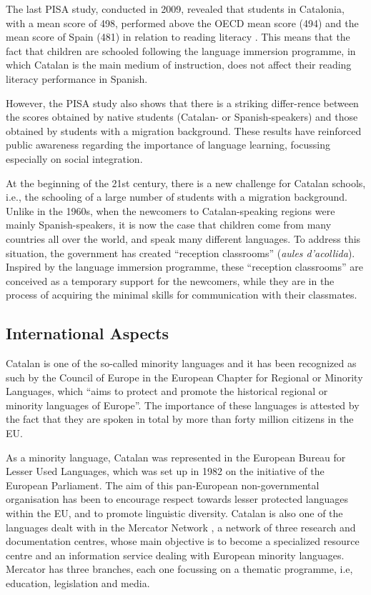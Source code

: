 \begin{multicols}{2}
The last PISA study, conducted in 2009, revealed that students in Catalonia, with a mean score of 498, performed above the OECD mean score (494) and the mean score of Spain (481) in relation to reading literacy \cite{CAT-Nota7}. This means that the fact that children are schooled following the language immersion programme, in which Catalan is the main medium of instruction, does not affect their reading literacy performance in Spanish.

However, the PISA study also shows that there is a striking differ-rence between the scores obtained by native students (Catalan- or Spanish-speakers) and those obtained by students with a migration background. These results have reinforced public awareness regarding the importance of language learning, focussing especially on social integration.

At the beginning of the 21st century, there is a new challenge for Catalan schools, i.e., the schooling of a large number of students with a migration background. Unlike in the 1960s, when the newcomers to Catalan-speaking regions were mainly Spanish-speakers, it is now the case that children come from many countries all over the world, and speak many different languages. To address this situation, the government has created “reception classrooms” (\textit{aules d’acollida}). Inspired by the language immersion programme, these “reception classrooms” are conceived as a temporary support for the newcomers, while they are in the process of acquiring the minimal skills for communication with their classmates.

\subsection{International Aspects}

Catalan is one of the so-called minority languages and it has been recognized as such by the Council of Europe in the European Chapter for Regional or Minority Languages, which “aims to protect and promote the historical regional or minority languages of Europe”. The importance of these languages is attested by the fact that they are spoken in total by more than forty million citizens in the EU.

As a minority language, Catalan was represented in the European Bureau for Lesser Used Languages, which was set up in 1982 on the initiative of the European Parliament. The aim of this pan-European non-governmental organisation has been to encourage respect towards lesser protected languages within the EU, and to promote linguistic diversity. Catalan is also one of the languages dealt with in the Mercator Network \cite{CAT-Nota8}, a network of three research and documentation centres, whose main objective is to become a specialized resource centre and an information service dealing with European minority languages. Mercator has three branches, each one focus\-sing on a thematic programme, i.e, education, legislation and media.


\end{multicols}
